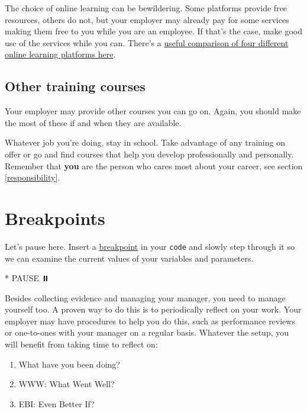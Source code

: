 \documentclass[
]{book}
\newenvironment{Shaded}{\begin{snugshade}}{\end{snugshade}}
\newcommand{\NormalTok}[1]{#1}
\newcommand{\SpecialStringTok}[1]{\textcolor[rgb]{0.31,0.60,0.02}{#1}}
\providecommand{\tightlist}{%
  \setlength{\itemsep}{0pt}\setlength{\parskip}{0pt}}
\begin{document}
The choice of online learning can be bewildering. Some platforms provide free resources, others do not, but your employer may already pay for some services making them free to you while you are an employee. If that's the case, make good use of the services while you can. There's a \href{https://www.businessinsider.com/online-learning-platform-comparison-udemy-skillshare-lynda-coursera}{useful comparison of four different online learning platforms here}. \citep{udemy}

\hypertarget{othertrain}{%
\subsection{Other training courses}\label{othertrain}}

Your employer may provide other courses you can go on. Again, you should make the most of these if and when they are available.

Whatever job you're doing, stay in school. Take advantage of any training on offer or go and find courses that help you develop professionally and personally. Remember that \textbf{you} are the person who cares most about your career, see section \ref{responsibility}.

\hypertarget{visits}{%
\section{Breakpoints}\label{visits}}

Let's pause here. Insert a \href{https://en.wikipedia.org/wiki/Breakpoint}{breakpoint} in your \texttt{code} and slowly step through it so we can examine the current values of your variables and parameters.

\begin{Shaded}
\begin{Highlighting}[]
\SpecialStringTok{* }\NormalTok{PAUSE ⏸️}
\end{Highlighting}
\end{Shaded}

Besides collecting evidence and managing your manager, you need to manage yourself too. A proven way to do this is to periodically reflect on your work. Your employer may have procedures to help you do this, such as performance reviews or one-to-ones with your manager on a regular basis. Whatever the setup, you will benefit from taking time to reflect on:

\begin{enumerate}
\def\labelenumi{\arabic{enumi}.}
\tightlist
\item
  What have you been doing?
\item
  WWW: What Went Well?
\item
  EBI: Even Better If?
\end{enumerate}
\end{document}
